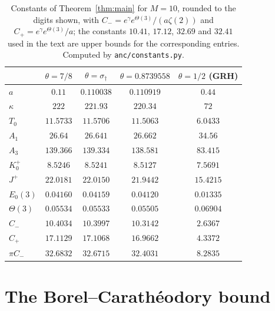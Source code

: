 \documentclass[11pt]{article}
\theoremstyle{definition}
\theoremstyle{remark}
\numberwithin{equation}{section}
\begin{document}
\begin{table}[ht]
\centering\small
\caption{Constants of Theorem~\ref{thm:main} for $M=10$, rounded to the digits shown, with $C_-=e^{\gamma}e^{\Theta(3)}/(a\zeta(2))$ and $C_+=e^{\gamma}e^{\Theta(3)}/a$; the constants $10.41$, $17.12$, $32.69$ and $32.41$ used in the text are upper bounds for the corresponding entries. Computed by \texttt{anc/constants.py}.}\label{tab:const}
\begin{tabular}{lcccc}
\toprule
 & $\theta=7/8$ & $\theta=\sigma_\dagger$ \cite{guo2026zf} & $\theta=0.8739558$ \cite{tracker2026} & $\theta=1/2$ (GRH)\\
\midrule
$a$ & $0.11$ & $0.110038$ & $0.110919$ & $0.44$\\
$\kappa$ & $222$ & $221.93$ & $220.34$ & $72$\\
$T_0$ & $11.5733$ & $11.5706$ & $11.5063$ & $6.0433$\\
$A_1$ & $26.64$ & $26.641$ & $26.662$ & $34.56$\\
$A_3$ & $139.366$ & $139.334$ & $138.581$ & $83.415$\\
$K_0^+$ & $8.5246$ & $8.5241$ & $8.5127$ & $7.5691$\\
$J^+$ & $22.0181$ & $22.0150$ & $21.9442$ & $15.4215$\\
$E_0(3)$ & $0.04160$ & $0.04159$ & $0.04120$ & $0.01335$\\
$\Theta(3)$ & $0.05534$ & $0.05533$ & $0.05505$ & $0.06904$\\
$C_-$ & $10.4034$ & $10.3997$ & $10.3142$ & $2.6367$\\
$C_+$ & $17.1129$ & $17.1068$ & $16.9662$ & $4.3372$\\
$\pi C_-$ & $32.6832$ & $32.6715$ & $32.4031$ & $8.2835$\\
\bottomrule
\end{tabular}
\end{table}

\section{The Borel--Carath\'eodory bound}\label{sec:bc}
\end{document}
